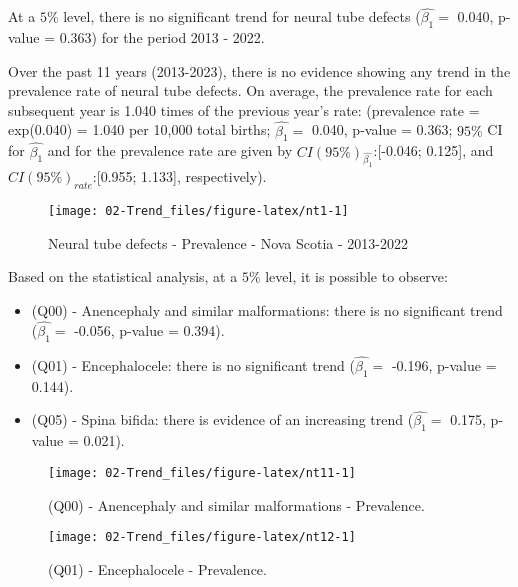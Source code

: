 \documentclass[
]{krantz}
\begin{document}
At a \(5\%\) level, there is no significant trend for neural tube defects (\(\hat{\beta_{1}} =\) 0.040, p-value = 0.363) for the period 2013 - 2022.

Over the past 11 years (2013-2023), there is no evidence showing any trend in the prevalence rate of neural tube defects. On average, the prevalence rate for each subsequent year is 1.040 times of the previous year's rate: (prevalence rate = exp(0.040) = 1.040 per 10,000 total births; \(\hat{\beta_{1}} =\) 0.040, p-value = 0.363; \(95\%\) CI for \(\hat{\beta_{1}}\) and for the prevalence rate are given by \(CI(95\%)_{\hat{\beta_{1}}}\):{[}-0.046; 0.125{]}, and \(CI(95\%)_{rate}\):{[}0.955; 1.133{]}, respectively).

\begin{figure}[h]

{\centering \texttt{[image: 02-Trend\_files/figure-latex/nt1-1]} 

}

\caption{Neural tube defects - Prevalence - Nova Scotia - 2013-2022}\label{fig:nt1}
\end{figure}

Based on the statistical analysis, at a \(5\%\) level, it is possible to observe:

\begin{itemize}
\item
  (Q00) - Anencephaly and similar malformations: there is no significant trend (\(\hat{\beta_{1}} =\) -0.056, p-value = 0.394).
\item
  (Q01) - Encephalocele: there is no significant trend (\(\hat{\beta_{1}} =\) -0.196, p-value = 0.144).
\item
  (Q05) - Spina bifida: there is evidence of an increasing trend (\(\hat{\beta_{1}} =\) 0.175, p-value = 0.021).
\end{itemize}

\begin{figure}[h]

{\centering \texttt{[image: 02-Trend\_files/figure-latex/nt11-1]} 

}

\caption{(Q00) - Anencephaly and similar malformations - Prevalence.}\label{fig:nt11}
\end{figure}

\begin{figure}[h]

{\centering \texttt{[image: 02-Trend\_files/figure-latex/nt12-1]} 

}

\caption{(Q01) - Encephalocele - Prevalence.}\label{fig:nt12}
\end{figure}
\end{document}
